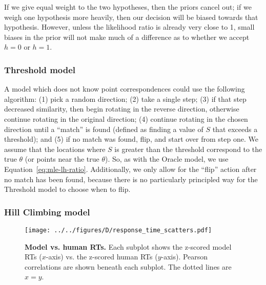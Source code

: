 \documentclass[10pt,letterpaper]{article}
\newcommand{\hi}[0]{h=0}
\newcommand{\hf}[0]{h=1}
\newcommand{\Oc}[0]{Oracle}
\newcommand{\Th}[0]{Threshold}
\begin{document}
If we give equal weight to the two hypotheses, then the priors cancel
out; if we weigh one hypothesis more heavily, then our decision will
be biased towards that hypothesis. However, unless the likelihood
ratio is already very close to 1, small biases in the prior will not
make much of a difference as to whether we accept $\hi$ or $\hf$.

\subsubsection{Threshold model}

A model which does not know point correspondences could use the
following algorithm: (1) pick a random direction; (2) take a single
step; (3) if that step decreased similarity, then begin rotating in
the reverse direction, otherwise continue rotating in the original
direction; (4) continue rotating in the chosen direction until a
``match'' is found (defined as finding a value of $S$ that exceeds a
threshold); and (5) if no match was found, flip, and start over from
step one.  We assume that the locations where $S$ is greater than the
threshold correspond to the true $\theta$ (or points near the true
$\theta$). So, as with the \Oc{} model, we use
Equation~\ref{eq:mle-lh-ratio}. Additionally, we only allow for the
``flip'' action after no match has been found, because there is no
particularly principled way for the \Th{} model to choose when to
flip.

\subsubsection{Hill Climbing model}

\begin{figure*}[t]
  \begin{center}
    \texttt{[image: ../../figures/D/response\_time\_scatters.pdf]}
    \caption{\textbf{Model vs. human RTs.} Each subplot shows the
      z-scored model RTs ($x$-axis) vs. the z-scored human RTs
      ($y$-axis). Pearson correlations are shown beneath each
      subplot. The dotted lines are $x=y$.}
    \label{fig:human-model-scatters}
  \end{center}
\end{figure*}
\end{document}
